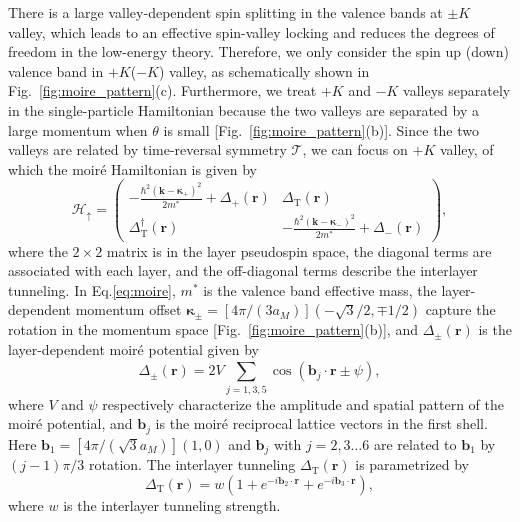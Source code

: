 \documentclass[aps,prx,floatfix,twocolumn]{revtex4-1}
\begin{document}
	There is a large valley-dependent spin splitting in the valence bands at $\pm K$ valley, which leads to an effective spin-valley locking \cite{xiao2012coupled} and reduces the degrees of freedom in the low-energy theory. Therefore, we only consider the spin up (down) valence band in $+K$($-K$) valley, as schematically shown in Fig.~\ref{fig:moire_pattern}(c).  Furthermore, we treat $+K$ and $-K$ valleys separately in the single-particle Hamiltonian because the two valleys are separated by a large momentum when $\theta$ is small [Fig.~\ref{fig:moire_pattern}(b)]. Since the two valleys are related by time-reversal symmetry $\mathcal{T}$, we can focus on $+K$ valley, of which the moir\'e Hamiltonian is given by \cite{wu2019topological}
	\begin{equation}
	\mathcal{H}_\uparrow=\begin{pmatrix}
	-\frac{\hbar^2 (\bm{k}-\bm{\kappa}_+)^2}{2m^*}+\Delta_{+}(\bm{r}) & \Delta_{\text{T}}(\bm{r})\\
	\Delta_{\text{T}}^\dagger(\bm{r}) & -\frac{\hbar^2(\bm{k}-\bm{\kappa}_-)^2}{2m^*}+\Delta_{-}(\bm{r})
	\end{pmatrix},
	\label{eq:moire}
	\end{equation}
	where the $2\times 2$ matrix is in the layer pseudospin space, the diagonal terms are associated with each layer, and the off-diagonal terms describe the interlayer tunneling. In Eq.\eqref{eq:moire}, $m^*$ is the valence band effective mass, the layer-dependent momentum offset $\bm{\kappa}_{\pm}=[4\pi/(3a_M)](-\sqrt{3}/2,\mp 1/2)$ capture the rotation in the momentum space [Fig.~\ref{fig:moire_pattern}(b)], and $\Delta_{\pm}(\bm{r})$ is the layer-dependent moir\'e potential given by
	\begin{equation}
	\Delta_{\pm}(\bm{r}) = 2 V \sum_{j=1,3,5}^{}\cos(\bm{b}_j\cdot \bm{r} \pm \psi),
	\end{equation}
	where $V$ and $\psi$ respectively characterize the amplitude and spatial pattern of the moir\'e potential, and $\bm{b}_j$ is the moir\'e reciprocal lattice vectors in the first shell. Here $\bm{b}_1=[4\pi/(\sqrt{3}a_M)](1,0)$ and $\bm{b}_j$ with $j=2,3\dots6$ are related to $\bm{b}_1$ by $(j-1)\pi/3$ rotation. 
	The interlayer tunneling $\Delta_{\text{T}}(\bm{r})$ is parametrized by
	\begin{equation}
	\Delta_{\text{T}}(\bm{r}) = w (1+e^{-i \bm{b}_2 \cdot \bm{r}}+e^{-i \bm{b}_3 \cdot \bm{r}}),
	\end{equation}
	where $w$ is the interlayer tunneling strength.
	
\end{document}
